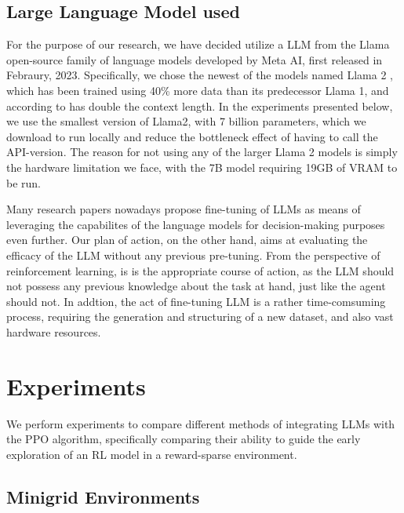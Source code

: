 \documentclass[conference]{IEEEtran}
\begin{document}
\subsection{Large Language Model used}

For the purpose of our research, we have decided utilize a LLM from the Llama open-source family of language models developed by Meta AI, first released in Febraury, 2023. Specifically, we chose the newest of the models named Llama 2 \cite{llama}, which has been trained using 40\% more data than its predecessor Llama 1, and according to \cite{meta} has double the context length. In the experiments presented below, we use the smallest version of Llama2, with 7 billion parameters, which we download to run locally and reduce the bottleneck effect of having to call the API-version. The reason for not using any of the larger Llama 2 models is simply the hardware limitation we face, with the 7B model requiring 19GB of VRAM to be run. 

Many research papers nowadays propose fine-tuning of LLMs as means of leveraging the capabilites of the language models for decision-making purposes even further. Our plan of action, on the other hand, aims at evaluating the efficacy of the LLM without any previous pre-tuning. From the perspective of reinforcement learning, is is the appropriate course of action, as the LLM should not possess any previous knowledge about the task at hand, just like the agent should not. In addtion, the act of fine-tuning LLM is a rather time-comsuming process, requiring the generation and structuring of a new dataset, and also vast hardware resources. 


\section{Experiments}

We perform experiments to compare different methods of integrating LLMs with the PPO algorithm, specifically comparing their ability to guide the early exploration of an RL model in a reward-sparse environment.

\subsection{Minigrid Environments}
\end{document}
